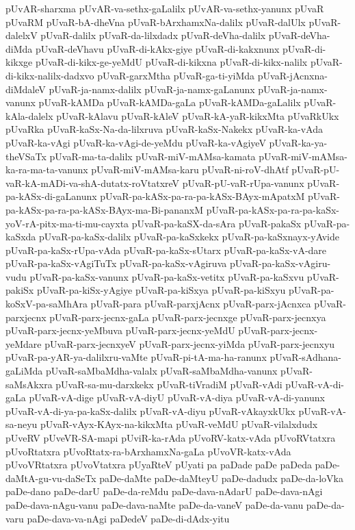 {pUvAR-sharxma
pUvAR-va-sethx-gaLalilx
pUvAR-va-sethx-yanunx
pUvaR
pUvaRM
pUvaR-bA-dheVna
pUvaR-bArxhamxNa-dalilx
pUvaR-dalUlx
pUvaR-dalelxV
pUvaR-dalilx
pUvaR-da-lilxdadx
pUvaR-deVha-dalilx
pUvaR-deVha-diMda
pUvaR-deVhavu
pUvaR-di-kAkx-giye
pUvaR-di-kakxnunx
pUvaR-di-kikxge
pUvaR-di-kikx-ge-yeMdU
pUvaR-di-kikxna
pUvaR-di-kikx-nalilx
pUvaR-di-kikx-nalilx-dadxvo
pUvaR-garxMtha
pUvaR-ga-ti-yiMda
pUvaR-jAcnxna-diMdaleV
pUvaR-ja-namx-dalilx
pUvaR-ja-namx-gaLanunx
pUvaR-ja-namx-vanunx
pUvaR-kAMDa
pUvaR-kAMDa-gaLa
pUvaR-kAMDa-gaLalilx
pUvaR-kAla-dalelx
pUvaR-kAlavu
pUvaR-kAleV
pUvaR-kA-yaR-kikxMta
pUvaRkUkx
pUvaRka
pUvaR-kaSx-Na-da-lilxruva
pUvaR-kaSx-Nakekx
pUvaR-ka-vAda
pUvaR-ka-vAgi
pUvaR-ka-vAgi-de-yeMdu
pUvaR-ka-vAgiyeV
pUvaR-ka-ya-theVSaTx
pUvaR-ma-ta-dalilx
pUvaR-miV-mAMsa-kamata
pUvaR-miV-mAMsa-ka-ra-ma-ta-vanunx
pUvaR-miV-mAMsa-karu
pUvaR-ni-roV-dhAtf
pUvaR-pU-vaR-kA-mADi-va-shA-dutatx-roVtatxreV
pUvaR-pU-vaR-rUpa-vanunx
pUvaR-pa-kASx-di-gaLanunx
pUvaR-pa-kASx-pa-ra-pa-kASx-BAyx-mApatxM
pUvaR-pa-kASx-pa-ra-pa-kASx-BAyx-ma-Bi-pananxM
pUvaR-pa-kASx-pa-ra-pa-kaSx-yoV-rA-pitx-ma-ti-mu-cayxta
pUvaR-pa-kaSX-da-sAra
pUvaR-pakaSx
pUvaR-pa-kaSxda
pUvaR-pa-kaSx-dalilx
pUvaR-pa-kaSxkekx
pUvaR-pa-kaSxnayx-yAvide
pUvaR-pa-kaSx-rUpa-vAda
pUvaR-pa-kaSx-sUtarx
pUvaR-pa-kaSx-vA-dare
pUvaR-pa-kaSx-vAgiTuTx
pUvaR-pa-kaSx-vAgiruva
pUvaR-pa-kaSx-vAgiru-vudu
pUvaR-pa-kaSx-vanunx
pUvaR-pa-kaSx-vetitx
pUvaR-pa-kaSxvu
pUvaR-pakiSx
pUvaR-pa-kiSx-yAgiye
pUvaR-pa-kiSxya
pUvaR-pa-kiSxyu
pUvaR-pa-koSxV-pa-saMhAra
pUvaR-para
pUvaR-parxjAcnx
pUvaR-parx-jAcnxca
pUvaR-parxjecnx
pUvaR-parx-jecnx-gaLa
pUvaR-parx-jecnxge
pUvaR-parx-jecnxya
pUvaR-parx-jecnx-yeMbuva
pUvaR-parx-jecnx-yeMdU
pUvaR-parx-jecnx-yeMdare
pUvaR-parx-jecnxyeV
pUvaR-parx-jecnx-yiMda
pUvaR-parx-jecnxyu
pUvaR-pa-yAR-ya-dalilxru-vaMte
pUvaR-pi-tA-ma-ha-ranunx
pUvaR-sAdhana-gaLiMda
pUvaR-saMbaMdha-valalx
pUvaR-saMbaMdha-vanunx
pUvaR-saMsAkxra
pUvaR-sa-mu-darxkekx
pUvaR-tiVradiM
pUvaR-vAdi
pUvaR-vA-di-gaLa
pUvaR-vA-dige
pUvaR-vA-diyU
pUvaR-vA-diya
pUvaR-vA-di-yanunx
pUvaR-vA-di-ya-pa-kaSx-dalilx
pUvaR-vA-diyu
pUvaR-vAkayxkUkx
pUvaR-vA-sa-neyu
pUvaR-vAyx-KAyx-na-kikxMta
pUvaR-veMdU
pUvaR-vilalxdudx
pUveRV
pUveVR-SA-mapi
pUviR-ka-rAda
pUvoRV-katx-vAda
pUvoRVtatxra
pUvoRtatxra
pUvoRtatx-ra-bArxhamxNa-gaLa
pUvoVR-katx-vAda
pUvoVRtatxra
pUvoVtatxra
pUyaRteV
pUyati
pa
paDade
paDe
paDeda
paDe-daMtA-gu-vu-daSeTx
paDe-daMte
paDe-daMteyU
paDe-dadudx
paDe-da-loVka
paDe-dano
paDe-darU
paDe-da-reMdu
paDe-dava-nAdarU
paDe-dava-nAgi
paDe-dava-nAgu-vanu
paDe-dava-naMte
paDe-da-vaneV
paDe-da-vanu
paDe-da-varu
paDe-dava-va-nAgi
paDedeV
paDe-di-dAdx-yitu
}
